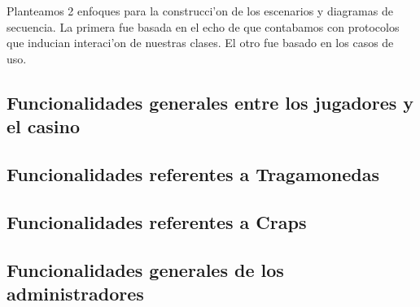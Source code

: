 Planteamos 2 enfoques para la construcci'on de los escenarios y diagramas de secuencia. La primera 
fue basada en el echo de que contabamos con protocolos que inducian interaci'on de
nuestras clases. El otro fue basado en los casos de uso.


\subsection{Funcionalidades generales entre los jugadores y el casino}



\subsection{Funcionalidades referentes a Tragamonedas}



\subsection{Funcionalidades referentes a Craps}



\subsection{Funcionalidades generales de los administradores}

